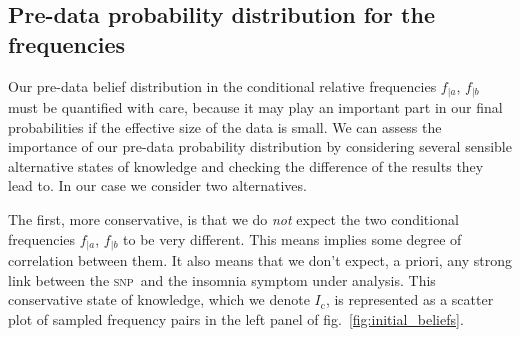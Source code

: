\documentclass[\ifafour a4paper,12pt,\else a5paper,10pt,\fi%
onecolumn,oneside,article,%
british%
]{memoir}
\theoremstyle{remark}
\theoremstyle{innote}
\renewcommand*{\|}[1][]{\nonscript\,#1\vert\nonscript\;\mathopen{}}
\newcommand*{\fig}{fig.}%
\newcommand*{\snp}{\textsc{snp}}
\newcommand*{\yI}{I}
\newcommand*{\yIc}{\yI_\text{c}}
\newcommand*{\ya}{a}
\newcommand*{\yb}{b}
\begin{document}
\subsection{Pre-data probability distribution for the frequencies}
\label{sec:p_initial}

Our pre-data belief distribution in the conditional relative frequencies
$f_{|\ya}$, $f_{|\yb}$ must be quantified with care, because it may play an
important part in our final probabilities if the effective size of the data
is small. We can assess the importance of our pre-data probability
distribution by considering several sensible alternative states of
knowledge and checking the difference of the results they lead to. In our
case we consider two alternatives.

The first, more conservative, is that we do \emph{not} expect the two
conditional frequencies $f_{|\ya}$, $f_{|\yb}$ to be very different. This
means implies some degree of correlation between them. It also means that
we don't expect, a priori, any strong link between the \snp\ and the
insomnia symptom under analysis. This conservative state of knowledge,
which we denote $\yIc$, is represented as a scatter plot of sampled
frequency pairs in the left panel of \fig~\ref{fig:initial_beliefs}.
\end{document}
